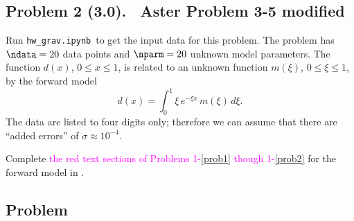 \documentclass[11pt,titlepage,fleqn]{article}
\newcommand{\tfile}{{\tt hw\_grav.ipynb}}
\newcommand{\numdataA}{20}
\newcommand{\numparmA}{20}
\newcommand{\mv}{\xi}  %
\newcommand{\dv}{x}  %
\newcommand{\tcolor}{magenta}
\begin{document}

\pagebreak
\subsection*{Problem 2 (3.0). \ptag\ Aster Problem 3-5 modified}

Run \tfile\ to get the input data for this problem.
The problem has $\ndata = \numdataA$ data points and $\nparm = \numparmA$ unknown model parameters.
The function $d(\dv)$, $0 \le \dv \le 1$, is related to an unknown function $m(\mv)$, $0 \le \mv \le 1$, by the forward model
%
\begin{equation}
d(\dv) = \int_0^1 \mv\,e^{-\mv \dv}\,m(\mv)\,d\mv.
\label{dy}
\end{equation}
%
The data are listed to four digits only; therefore we can assume that there are ``added errors'' of $\sigma \approx 10^{-4}$.


\bigskip\noindent
Complete \textcolor{\tcolor}{the red text sections of Problems 1-\ref{prob1} though 1-\ref{prob2}} for the forward model in .



\subsection*{Problem} \howmuchtime\





\end{document}
